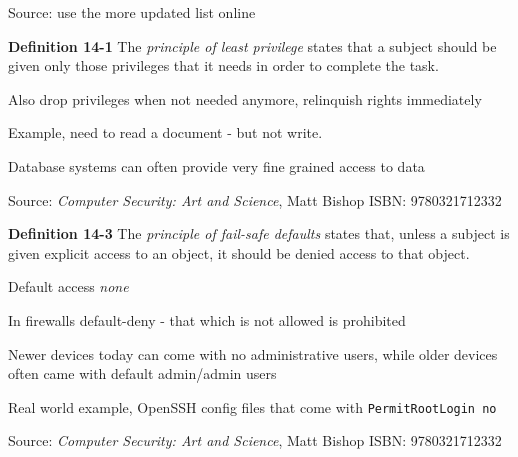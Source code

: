 \documentclass[Screen16to9,17pt]{foils}
\begin{document}


Source: use the more updated list online




\begin{list1}
\item {\bf Definition 14-1} The \emph{principle of least privilege} states that a subject should be given only those privileges that it needs in order to complete the task.
\item Also drop privileges when not needed anymore, relinquish rights immediately
\item Example, need to read a document - but not write.
\item Database systems can often provide very fine grained access to data
\end{list1}

Source:
\emph{Computer Security: Art and Science}, Matt Bishop ISBN: 9780321712332\\
{\footnotesize{}}


\begin{list1}
\item {\bf Definition 14-3} The \emph{principle of fail-safe defaults} states that, unless a subject is given explicit access to an object, it should be denied access to that object.
\item Default access \emph{none}
\item In firewalls default-deny - that which is not allowed is prohibited
\item Newer devices today can come with no administrative users, while older devices often came with default admin/admin users
\item Real world example, OpenSSH config files that come with \verb+PermitRootLogin no+
\end{list1}

Source:
\emph{Computer Security: Art and Science}, Matt Bishop ISBN: 9780321712332\\
{\footnotesize{}}
\end{document}
